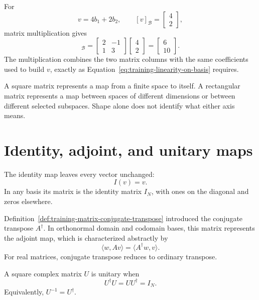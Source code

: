 For
\begin{equation}
  v=4b_1+2b_2,
  \qquad
  [v]_{\mathcal B}=\begin{bmatrix}4\\2\end{bmatrix},
\end{equation}
matrix multiplication gives
\begin{equation}
  [A(v)]_{\mathcal B}
  =\begin{bmatrix}
    2 & -1\\
    1 & 3
  \end{bmatrix}
  \begin{bmatrix}4\\2\end{bmatrix}
  =\begin{bmatrix}6\\10\end{bmatrix}.
\end{equation}
The multiplication combines the two matrix columns with the same coefficients
used to build \(v\), exactly as Equation~\eqref{eq:training-linearity-on-basis}
requires.

A square matrix represents a map from a finite space to itself. A rectangular
matrix represents a map between spaces of different dimensions or between
different selected subspaces. Shape alone does not identify what either axis
means.

\section{Identity, adjoint, and unitary maps}

The identity map leaves every vector unchanged:
\begin{equation}
  I(v)=v.
\end{equation}
In any basis its matrix is the identity matrix \(I_N\), with ones on the
diagonal and zeros elsewhere.

Definition~\ref{def:training-matrix-conjugate-transpose} introduced the
conjugate transpose \(A^{\dagger}\). In orthonormal domain and codomain bases,
this matrix represents the adjoint map, which is characterized abstractly by
\begin{equation}
  \langle w,A v\rangle
  =\langle A^{\dagger}w,v\rangle.
\end{equation}
For real matrices, conjugate transpose reduces to ordinary transpose.

\begin{definition}
A square complex matrix \(U\) is unitary when
\begin{equation}
  U^{\dagger}U=UU^{\dagger}=I_N.
  \label{eq:training-unitary-definition}
\end{equation}
Equivalently, \(U^{-1}=U^{\dagger}\).
\end{definition}

